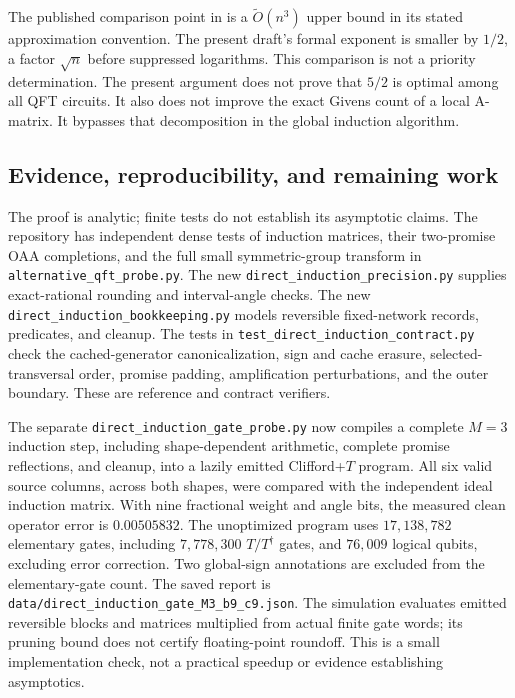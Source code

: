 \documentclass[11pt]{article}
\theoremstyle{definition}
\begin{document}
The published comparison point in \cite{bgo} is a $\widetilde O(n^3)$
upper bound in its stated approximation convention. The present draft's
formal exponent is smaller by $1/2$, a factor $\sqrt n$ before suppressed
logarithms. This comparison is not a priority determination. The present
argument does not prove that $5/2$ is optimal among all QFT circuits.
It also does not improve the exact Givens count of a local A-matrix.
It bypasses that decomposition in the global induction algorithm.

\subsection{Evidence, reproducibility, and remaining work}

The proof is analytic; finite tests do not establish its asymptotic claims.
The repository has independent dense tests of induction matrices, their
two-promise OAA completions, and the full small symmetric-group transform
in \texttt{alternative\_qft\_probe.py}. The new
\texttt{direct\_induction\_precision.py} supplies exact-rational rounding
and interval-angle checks. The new
\texttt{direct\_induction\_bookkeeping.py} models reversible fixed-network
records, predicates, and cleanup. The tests in
\texttt{test\_direct\_induction\_contract.py} check the cached-generator
canonicalization, sign and cache erasure, selected-transversal order,
promise padding, amplification perturbations, and the outer boundary.
These are reference and contract verifiers.

The separate \texttt{direct\_induction\_gate\_probe.py} now compiles a
complete $M=3$ induction step, including shape-dependent arithmetic,
complete promise reflections, and cleanup, into a lazily emitted
Clifford+$T$ program. All six valid source columns, across both shapes,
were compared with the independent ideal induction matrix. With nine
fractional weight and angle bits, the measured clean operator error is
$0.00505832$. The unoptimized program uses $17{,}138{,}782$ elementary
gates, including $7{,}778{,}300$ $T/T^\dagger$ gates, and $76{,}009$
logical qubits, excluding error correction. Two global-sign annotations
are excluded from the elementary-gate count. The saved report is
\texttt{data/direct\_induction\_gate\_M3\_b9\_c9.json}.
The simulation evaluates emitted reversible blocks and matrices multiplied
from actual finite gate words; its pruning bound does not certify
floating-point roundoff. This is a small implementation check, not a
practical speedup or evidence establishing asymptotics.
\end{document}
